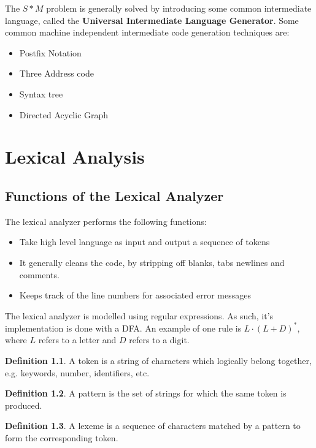 \documentclass[12pt,letterpaper]{amsbook}
\theoremstyle{definition}
\newtheorem{definition}{Definition}[section] %
\begin{document}
The $S*M$ problem is generally solved by introducing some common intermediate language, called the \textbf{Universal Intermediate Language Generator}. Some common machine independent intermediate code generation techniques are:

\begin{itemize}
  \item Postfix Notation
  \item Three Address code
  \item Syntax tree
  \item Directed Acyclic Graph
\end{itemize}


\chapter{Lexical Analysis}

\section{Functions of the Lexical Analyzer}

The lexical analyzer performs the following functions:

\begin{itemize}
  \item Take high level language as input and output a sequence of tokens
  \item It generally cleans the code, by stripping off blanks, tabs newlines and comments.
  \item Keeps track of the line numbers for associated error messages
\end{itemize}

The lexical analyzer is modelled using regular expressions. As such, it's implementation is done with a DFA. An example of one rule is $L \cdot (L+D)^*$, where $L$ refers to a letter and $D$ refers to a digit.

\begin{definition}
  A token is a string of characters which logically belong together, e.g. keywords, number, identifiers, etc.
\end{definition}

\begin{definition}
  A pattern is the set of strings for which the same token is produced.
\end{definition}

\begin{definition}
  A lexeme is a sequence of characters matched by a pattern to form the corresponding token.
\end{definition}
\end{document}
